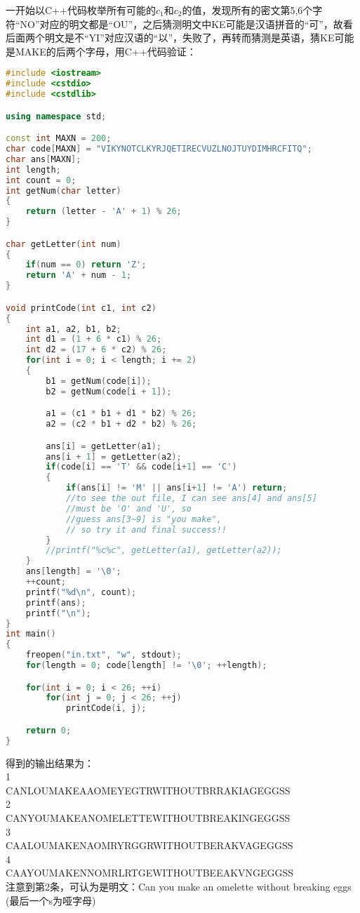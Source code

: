 \documentclass[12pt]{article}
\begin{document}
        一开始以C++代码枚举所有可能的$c_{1}$和$c_{2}$的值，发现所有的密文第5,6个字符“NO”对应的明文都是“OU”，之后猜测明文中KE可能是汉语拼音的“可”，故看后面两个明文是不“YI”对应汉语的“以”，失败了，再转而猜测是英语，猜KE可能是MAKE的后两个字母，用C++代码验证：\\
        \begin{lstlisting}[language=C++]
#include <iostream>
#include <cstdio>
#include <cstdlib>

using namespace std;

const int MAXN = 200;
char code[MAXN] = "VIKYNOTCLKYRJQETIRECVUZLNOJTUYDIMHRCFITQ";
char ans[MAXN];
int length;
int count = 0;
int getNum(char letter)
{
    return (letter - 'A' + 1) % 26;
}

char getLetter(int num)
{
    if(num == 0) return 'Z';
    return 'A' + num - 1;
}

void printCode(int c1, int c2)
{
    int a1, a2, b1, b2;
    int d1 = (1 + 6 * c1) % 26;
    int d2 = (17 + 6 * c2) % 26;
    for(int i = 0; i < length; i += 2)
    {
        b1 = getNum(code[i]);
        b2 = getNum(code[i + 1]);

        a1 = (c1 * b1 + d1 * b2) % 26;
        a2 = (c2 * b1 + d2 * b2) % 26;

        ans[i] = getLetter(a1);
        ans[i + 1] = getLetter(a2);
        if(code[i] == 'T' && code[i+1] == 'C')
        {
            if(ans[i] != 'M' || ans[i+1] != 'A') return;
            //to see the out file, I can see ans[4] and ans[5] 
            //must be 'O' and 'U', so
            //guess ans[3~9] is "you make",
            // so try it and final success!!
        }
        //printf("%c%c", getLetter(a1), getLetter(a2));
    }
    ans[length] = '\0';
    ++count;
    printf("%d\n", count);
    printf(ans);
    printf("\n");
}
int main()
{
    freopen("in.txt", "w", stdout);
    for(length = 0; code[length] != '\0'; ++length);

    for(int i = 0; i < 26; ++i)
        for(int j = 0; j < 26; ++j)
            printCode(i, j);

    return 0;
}
        \end{lstlisting}
        得到的输出结果为：\\
        1\\
        CANLOUMAKEAAOMEYEGTRWITHOUTBRRAKIAGEGGSS\\
        2\\
        CANYOUMAKEANOMELETTEWITHOUTBREAKINGEGGSS\\
        3\\
        CAALOUMAKENAOMRYRGGRWITHOUTBERAKVAGEGGSS\\
        4\\
        CAAYOUMAKENNOMRLRTGEWITHOUTBEEAKVNGEGGSS\\
        注意到第2条，可认为是明文：Can you make an omelette without breaking eggs (最后一个s为哑字母)\\
\end{document}
